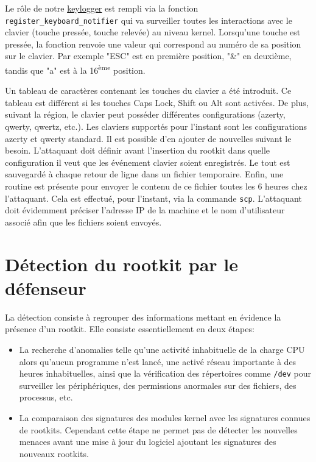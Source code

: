 \documentclass[12pt]{article}
\begin{document}
        Le rôle de notre \href{https://github.com/QuokkaLight/rkduck/blob/master/rkduck/keylogger.c}{keylogger} est rempli via la fonction \texttt{register\_keyboard\_notifier} qui va surveiller toutes les interactions avec le clavier (touche pressée, touche relevée) au niveau kernel. Lorsqu'une touche est pressée, la fonction renvoie une valeur qui correspond au numéro de sa position sur le clavier. Par exemple "ESC" est en première position, "\&" en deuxième, tandis que "a" est à la 16\textsuperscript{ème} position.
        
        Un tableau de caractères contenant les touches du clavier a été introduit. Ce tableau est différent si les touches Caps Lock, Shift ou Alt sont activées. De plus, suivant la région, le clavier peut posséder différentes configurations (azerty, qwerty, qwertz, etc.). Les claviers supportés pour l'instant sont les configurations azerty et qwerty standard. Il est possible d'en ajouter de nouvelles suivant le besoin. L'attaquant doit définir avant l'insertion du rootkit dans quelle configuration il veut que les événement clavier soient enregistrés. Le tout est sauvegardé à chaque retour de ligne dans un fichier temporaire.         
        Enfin, une routine est présente pour envoyer le contenu de ce fichier toutes les 6 heures chez l'attaquant. Cela est effectué, pour l'instant, via la commande \texttt{scp}. L'attaquant doit évidemment préciser l'adresse IP de la machine et le nom d'utilisateur associé afin que les fichiers soient envoyés.
                
\section{Détection du rootkit par le défenseur}
    
    La détection consiste à regrouper des informations mettant en évidence la présence d'un rootkit. Elle consiste essentiellement en deux étapes\cite{detection}:
    \begin{itemize}
    	\item La recherche d'anomalies telle qu'une activité inhabituelle de la charge CPU alors qu'aucun programme n'est lancé, une activé réseau importante à des heures inhabituelles, ainsi que la vérification des répertoires comme \texttt{/dev} pour surveiller les périphériques, des permissions anormales sur des fichiers, des processus, etc.
    	\item La comparaison des signatures des modules kernel avec les signatures connues de rootkits. Cependant cette étape ne permet pas de détecter les nouvelles menaces avant une mise à jour du logiciel ajoutant les signatures des nouveaux rootkits.
    \end{itemize}
    
\end{document}
